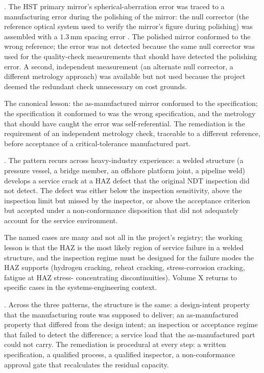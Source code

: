 . The HST
primary mirror's spherical-aberration error was traced to a
manufacturing error during the polishing of the mirror: the null
corrector (the reference optical system used to verify the mirror's
figure during polishing) was assembled with a $1.3\,\text{mm}$
spacing error \cite{acc:nasa-hubble-optical-systems-1990}. The
polished mirror conformed to the wrong reference; the error was
not detected because the same null corrector was used for the
quality-check measurements that should have detected the polishing
error. A second, independent measurement (an alternate null corrector,
a different metrology approach) was available but not used because
the project deemed the redundant check unnecessary on cost grounds.

The canonical lesson: the as-manufactured mirror conformed to the
specification; the specification it conformed to was the wrong
specification, and the metrology that should have caught the error
was self-referential. The remediation is the requirement of an
independent metrology check, traceable to a different reference,
before acceptance of a critical-tolerance manufactured part.

.
The pattern recurs across heavy-industry experience: a welded
structure (a pressure vessel, a bridge member, an offshore platform
joint, a pipeline weld) develops a service crack at a HAZ defect
that the original NDT inspection did not detect. The defect was
either below the inspection sensitivity, above the inspection limit
but missed by the inspector, or above the acceptance criterion but
accepted under a non-conformance disposition that did not adequately
account for the service environment.

The named cases are many and not all in the project's registry; the
working lesson is that the HAZ is the most likely region of service
failure in a welded structure, and the inspection regime must be
designed for the failure modes the HAZ supports (hydrogen cracking,
reheat cracking, stress-corrosion cracking, fatigue at HAZ stress-
concentrating discontinuities). Volume X returns to specific cases
in the systems-engineering context.

.
Across the three patterns, the structure is the same: a design-intent
property that the manufacturing route was supposed to deliver; an
as-manufactured property that differed from the design intent; an
inspection or acceptance regime that failed to detect the difference;
a service load that the as-manufactured part could not carry. The
remediation is procedural at every step: a written specification, a
qualified process, a qualified inspector, a non-conformance approval
gate that recalculates the residual capacity.

